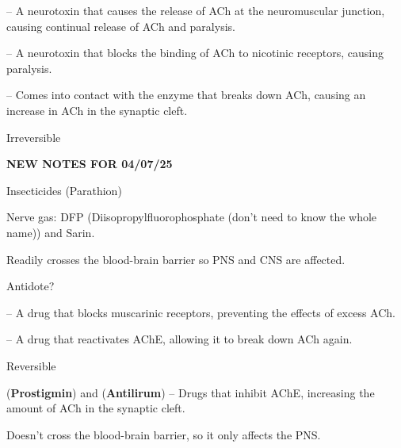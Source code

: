\begin{coloredlist}
    \item {} -- A neurotoxin that causes the release of ACh at the neuromuscular junction, causing continual release of ACh and paralysis.
    \item {} -- A neurotoxin that blocks the binding of ACh to nicotinic receptors, causing paralysis.
    \item {} -- Comes into contact with the enzyme that breaks down ACh, causing an increase in ACh in the synaptic cleft.
    \begin{coloredlist}
        \item Irreversible
        \begin{center}
            \textbf{NEW NOTES FOR 04/07/25} \\
            \hrulefill
        \end{center}
        \begin{coloredlist}
            \item Insecticides (Parathion)
            \item Nerve gas: DFP (Diisopropylfluorophosphate (don't need to know the whole name)) and Sarin.
            \begin{coloredlist}
                \item Readily crosses the blood-brain barrier so PNS and CNS are affected.
                \item Antidote? 
                \begin{coloredlist}
                    \item {} -- A drug that blocks muscarinic receptors, preventing the effects of excess ACh.
                    \item {} -- A drug that reactivates AChE, allowing it to break down ACh again.
                \end{coloredlist}
            \end{coloredlist}
        \end{coloredlist}
        \item Reversible
        \begin{coloredlist}
            \item {} (\textbf{Prostigmin}) and  (\textbf{Antilirum}) -- Drugs that inhibit AChE, increasing the amount of ACh in the synaptic cleft.
            \begin{coloredlist}
                \item Doesn't cross the blood-brain barrier, so it only affects the PNS.

\end{coloredlist}
\end{coloredlist}
\end{coloredlist}
\end{coloredlist}
